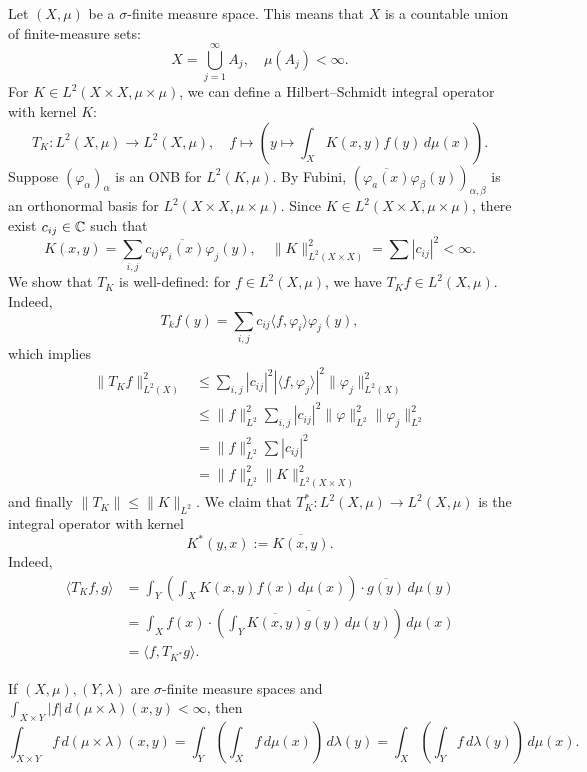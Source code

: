 Let $(X, \mu)$ be a $\sigma$-finite measure space.
This means that $X$ is a countable union of finite-measure sets:
$$X = \bigcup_{j = 1} ^\infty A_j,\quad \mu(A_j) < \infty.$$
For $K \in L^2 (X \times X, \mu \times \mu)$, we can define a Hilbert--Schmidt integral operator 
with kernel $K$:
$$T_K : L^2 (X, \mu) \to L^2 (X, \mu),\quad f \mapsto \left(y \mapsto \int_X K(x, y) f(y)\, d\mu (x)\right).$$
Suppose $(\varphi_\alpha)_{\alpha}$ is an ONB for $L^2 (K, \mu)$.
By Fubini, $\left(\overline{\varphi_a (x)} \varphi_\beta (y)\right)_{\alpha, \beta}$
is an orthonormal basis for $L^2 (X \times X, \mu \times \mu)$.
Since $K \in L^2 (X \times X, \mu \times \mu)$, there exist $c_{ij} \in \mathbb {C}$ such that 
$$K(x, y) = \sum_{i,j} c_{ij} \overline{\varphi_i (x)} \varphi_j (y),\quad \| K\|^2 _{L^2 (X \times X)} = \sum |c_{ij}|^2 < \infty.$$
We show that $T_K$ is well-defined: for $f \in L^2 (X, \mu)$, we have $T_K f \in L^2 (X,\mu)$.
Indeed,
$$T_k f (y) = \sum_{i, j} c_{ij} \langle f, \varphi_i \rangle \varphi_j (y),$$
which implies 
\begin{align*}
  \| T_K f\|_{L^2 (X)} ^2 &\leq \sum_{i, j} |c_{ij}|^2 |\langle f, \varphi_j\rangle|^2 \| \varphi_j\|^2 _{L^2 (X)}\\
  &\leq \| f\|_{L^2} ^2 \sum_{i, j} |c_{ij}|^2 \| \varphi\|^2 _{L^2} \| \varphi_j\|^2 _{L^2}\\
  &= \| f\|^2 _{L^2} \sum|c_{ij}|^2\\
  &= \| f\|^2 _{L^2} \|K\|^2 _{L^2 (X \times X)}
\end{align*}
and finally $\| T_K\| \leq \|K\|_{L^2}$.
We claim that $T_K ^* : L^2 (X, \mu) \to L^2 (X, \mu)$ is the integral operator with kernel 
$$K^* (y, x) := \overline{K(x, y)}.$$
Indeed, 
\begin{align*}
  \langle T_K f, g \rangle &= \int_Y \left(\int_X K(x, y) f(x) \, d\mu (x)\right) \cdot \overline{g(y)}\, d\mu (y)\\
  &= \int_X f(x) \cdot \left(\overline{\int_Y \overline{K(x, y)} g(y)\, d\mu(y)}\right)\, d\mu (x)\\ 
  &= \langle f, T_{K^*} g \rangle.
\end{align*}

\begin{remark}
  If $(X, \mu), (Y,\lambda)$ are $\sigma$-finite measure spaces and $\int_{X \times Y} |f|\, d(\mu \times \lambda) (x, y) < \infty$, then 
  $$\int_{X \times Y} f \, d(\mu \times \lambda)(x, y)= \int_Y \left(\int_X f\, d\mu(x)\right)\, d\lambda(y) = \int_X \left(\int_Y f\, d\lambda(y)\right)\, d\mu(x).$$
\end{remark}

